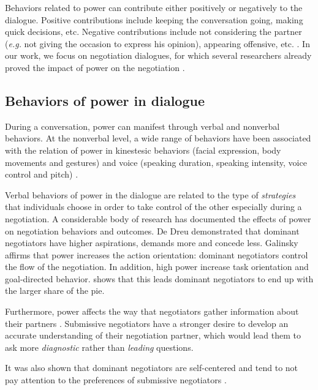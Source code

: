 \documentclass{llncs}
\begin{document}
	Behaviors related to power can contribute either positively or negatively to the dialogue. Positive contributions include keeping the conversation going, making quick decisions, etc. Negative contributions include not considering the partner (\emph{e.g.} not giving the occasion to express his opinion), appearing offensive, etc. \cite{zablotskaya2012relating}. In our work, we focus on negotiation dialogues, for which several researchers already proved the impact of power on the negotiation \cite{van2006power}.
	
	\subsection{Behaviors of power in dialogue}
	\label{domDialogue}
	During a conversation, power can manifest through verbal and nonverbal behaviors.	
	At the nonverbal level, a wide range of behaviors have been associated with the relation of power in kinestesic behaviors (facial expression, body movements and gestures) and voice (speaking duration, speaking intensity, voice control and pitch) \cite{burgoonnonverbal}.
	
	Verbal behaviors of power in the dialogue are related to the type of \textit{strategies} that individuals choose in order to take control of the other especially during a negotiation. A considerable body of research has documented the effects of power on negotiation behaviors and outcomes. De Dreu demonstrated that \cite{de1995impact} dominant negotiators have higher aspirations, demands more and concede less. Galinsky \cite{galinsky2003power} affirms that power increases the action orientation: dominant negotiators control the flow of the negotiation. In addition, high power increase task orientation and goal-directed behavior. \cite{giebels2000interdependence} shows that this leads dominant negotiators to end up with the larger share of the pie.
	
	Furthermore, power affects the way that negotiators gather information about their partners \cite{de2004influence}. Submissive negotiators have a stronger desire to develop an accurate understanding of their negotiation partner, which would lead them to ask more \emph{diagnostic} rather than \emph{leading} questions.
	
	It was also shown that dominant negotiators are self-centered and tend to not pay attention to the preferences of submissive negotiators \cite{fiske1993controlling,de1995impact}.
\end{document}
